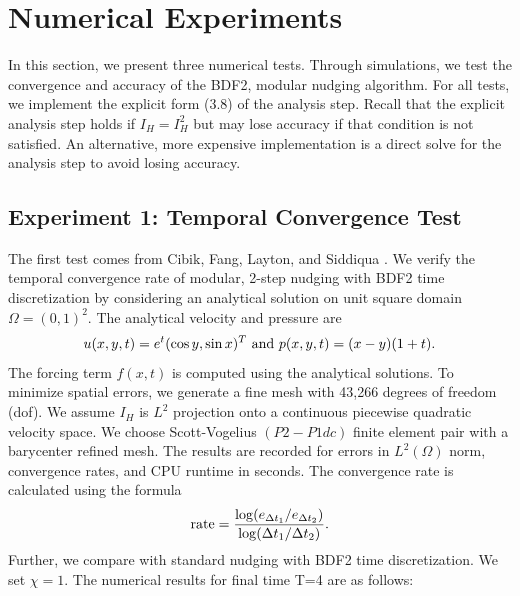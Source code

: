 \documentclass[11pt,a4paper]{article}
\begin{document}
\section{Numerical Experiments}
In this section, we present three numerical tests. Through simulations, we test the convergence and accuracy of the BDF2, modular nudging algorithm. For all tests, we implement the explicit form (3.8) of the analysis step.
Recall that the explicit analysis step holds if $I_H=I_H^2$ but may lose accuracy if that condition is not satisfied. An alternative, more expensive implementation is a direct solve for the analysis step to avoid losing accuracy.
\subsection{Experiment 1: Temporal Convergence Test}
The first test comes from Cibik, Fang, Layton, and Siddiqua \cite{Cibik:2025}. We verify the temporal convergence rate of modular, 2-step nudging with BDF2 time discretization by considering an analytical solution on unit square domain $\Omega=(0,1)^2$. The analytical velocity and pressure are
\begin{align}
    u(x,y,t)=e^t(\cos y, \sin x)^T \text{ and } p(x,y,t)=(x-y)(1+t). \notag
\end{align}
The forcing term $f(x,t)$ is computed using the analytical solutions. To minimize spatial errors, we generate a fine mesh with 43,266 degrees of freedom (dof). We assume $I_H$ is $L^2$ projection onto a continuous piecewise quadratic velocity space. We choose Scott-Vogelius $(P2-P1dc)$ finite element pair with a barycenter refined mesh. The results are recorded for errors in $L^2(\Omega)$ norm, convergence rates, and CPU runtime in seconds. The convergence rate is calculated using the formula
\begin{align}
    \text{rate}=\frac{\log(e_{\Delta t_1}/e_{\Delta t_2})}{\log(\Delta t_1/\Delta t_2)}. \notag
\end{align}
Further, we compare with standard nudging with BDF2 time discretization. We set $\chi=1$. The numerical results for final time T=4 are as follows:
\end{document}
